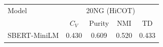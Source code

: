 \begin{tabular}{lcccc}
\toprule
Model & \multicolumn{4}{c}{20NG (HiCOT)} \\
 & $C_V$ & Purity & NMI & TD \\
\midrule
SBERT-MiniLM & 0.430 & 0.609 & 0.520 & 0.433 \\
\bottomrule
\end{tabular}
